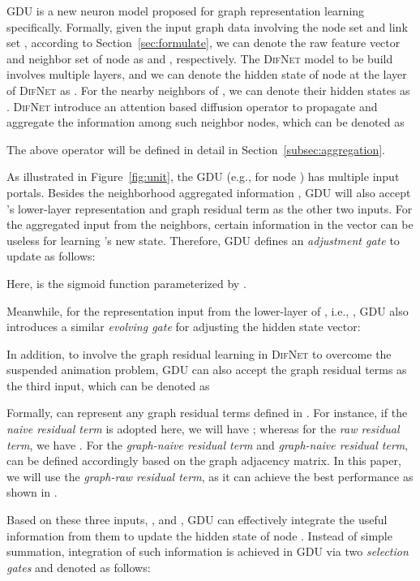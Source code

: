\documentclass{article}
\newcommand{\our}{\textsc{DifNet}}
\newcommand{\gdu}{\textsc{GDU}}
\begin{document}
{\gdu} is a new neuron model proposed for graph representation learning specifically. Formally, given the input graph data  involving the node set  and link set , according to Section~\ref{sec:formulate}, we can denote the raw feature vector and neighbor set of node  as  and , respectively. The {\our} model to be build involves multiple layers, and we can denote the hidden state of node  at the  layer of {\our} as . For the nearby neighbors of , we can denote their hidden states as . {\our} introduce an attention based diffusion operator to propagate and aggregate the information among such neighbor nodes, which can be denoted as

The above operator will be defined in detail in Section~\ref{subsec:aggregation}.

As illustrated in Figure~\ref{fig:unit}, the {\gdu} (e.g., for node ) has multiple input portals. Besides the neighborhood aggregated information , {\gdu} will also accept 's lower-layer representation  and graph residual term  as the other two inputs. For the aggregated input  from the neighbors, certain information in the vector can be useless for learning 's new state. Therefore, {\gdu} defines an \textit{adjustment gate}  to update  as follows:

Here,  is the sigmoid function parameterized by . 

Meanwhile, for the representation input from the lower-layer of , i.e., , {\gdu} also introduces a similar \textit{evolving gate}  for adjusting the hidden state vector:


In addition, to involve the graph residual learning \cite{Zhang_GResNet_19} in {\our} to overcome the suspended animation problem, {\gdu} can also accept the graph residual terms as the third input, which can be denoted as

Formally,  can represent any graph residual terms defined in \cite{Zhang_GResNet_19}. For instance, if the \textit{naive residual term} is adopted here, we will have ; whereas for the \textit{raw residual term}, we have . For the \textit{graph-naive residual term} and \textit{graph-naive residual term},  can be defined accordingly based on the graph adjacency matrix. In this paper, we will use the \textit{graph-raw residual term}, as it can achieve the best performance as shown in \cite{Zhang_GResNet_19}.

Based on these three inputs, ,  and , {\gdu} can effectively integrate the useful information from them to update the hidden state of node . Instead of simple summation, integration of such information is achieved in {\gdu} via two \textit{selection gates}  and  denoted as follows: \begingroup\makeatletter\def\f@size{8}\check@mathfonts 
\end{document}
